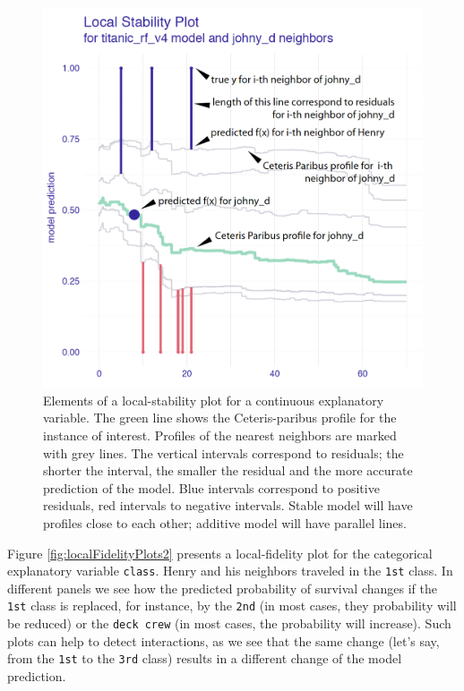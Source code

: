 \documentclass[]{krantz}
\begin{document}
\begin{figure}

{\centering \includegraphics[width=0.7\linewidth]{figure/localFidelityPlots} 

}

\caption{Elements of a local-stability plot for a continuous explanatory variable. The green line shows the Ceteris-paribus profile for the instance of interest. Profiles of the nearest neighbors are marked with grey lines. The vertical intervals correspond to residuals; the shorter the interval, the smaller the residual and the more accurate prediction of the model. Blue intervals correspond to positive residuals, red intervals to negative intervals. Stable model will have profiles close to each other; additive model will have parallel lines.}\label{fig:localFidelityPlots}
\end{figure}

Figure \ref{fig:localFidelityPlots2} presents a local-fidelity plot for the categorical explanatory variable \texttt{class}. Henry and his neighbors traveled in the \texttt{1st} class. In different panels we see how the predicted probability of survival changes if the \texttt{1st} class is replaced, for instance, by the \texttt{2nd} (in most cases, they probability will be reduced) or the \texttt{deck\ crew} (in most cases, the probability will increase). Such plots can help to detect interactions, as we see that the same change (let's say, from the \texttt{1st} to the \texttt{3rd} class) results in a different change of the model prediction.
\end{document}
